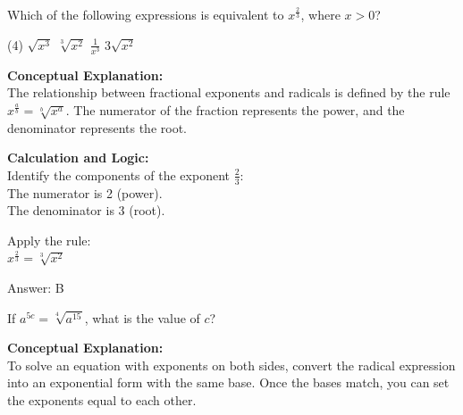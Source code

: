 \documentclass[11pt,paper=a4,answers]{exam}
\begin{document}
\begin{questions}
\pointsinrightmargin
\pointsdroppedatright
\marksnotpoints
{}
\pointformat{\boldmath\themarginpoints}
\bracketedpoints



\question
Which of the following expressions is equivalent to $x^{\frac{2}{3}}$, where $x > 0$?
\begin{tasks}(4)
    \task $\sqrt{x^3}$
    \task $\sqrt[3]{x^2}$
    \task $\frac{1}{x^3}$
    \task $3\sqrt{x^2}$
\end{tasks}

\begin{solution}
\textbf{Conceptual Explanation:} \\
The relationship between fractional exponents and radicals is defined by the rule $x^{\frac{a}{b}} = \sqrt[b]{x^a}$. The numerator of the fraction represents the power, and the denominator represents the root.

\vspace{20pt}

\textbf{Calculation and Logic:} \\
Identify the components of the exponent $\frac{2}{3}$: \\
The numerator is 2 (power). \\
The denominator is 3 (root).

\vspace{10pt}

Apply the rule: \\
$x^{\frac{2}{3}} = \sqrt[3]{x^2}$

\vspace{25pt}

Answer: \colorbox{yellow!100}{B}
\end{solution}

\vspace{40pt}

\question
If $a^{5c} = \sqrt[4]{a^{15}}$, what is the value of $c$?

\begin{solution}
\textbf{Conceptual Explanation:} \\
To solve an equation with exponents on both sides, convert the radical expression into an exponential form with the same base. Once the bases match, you can set the exponents equal to each other.


\end{solution}
\end{questions}
\end{document}
